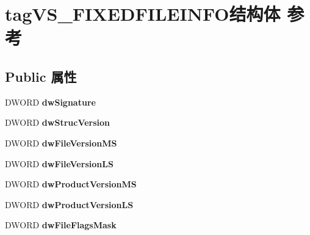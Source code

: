 \hypertarget{structtag_v_s___f_i_x_e_d_f_i_l_e_i_n_f_o}{}\section{tag\+V\+S\+\_\+\+F\+I\+X\+E\+D\+F\+I\+L\+E\+I\+N\+F\+O结构体 参考}
\label{structtag_v_s___f_i_x_e_d_f_i_l_e_i_n_f_o}
\subsection*{Public 属性}
\begin{DoxyCompactItemize}
\item 
\mbox{\label{structtag_v_s___f_i_x_e_d_f_i_l_e_i_n_f_o_a84593aae084038fcb6aa0e0f9b055dbc}} 
D\+W\+O\+RD {\bfseries dw\+Signature}
\item 
\mbox{\label{structtag_v_s___f_i_x_e_d_f_i_l_e_i_n_f_o_a707d68ab4bb1fcc55a5bfe88940ef8c8}} 
D\+W\+O\+RD {\bfseries dw\+Struc\+Version}
\item 
\mbox{\label{structtag_v_s___f_i_x_e_d_f_i_l_e_i_n_f_o_a1c8caf9934c1ecf08e636647fb367c94}} 
D\+W\+O\+RD {\bfseries dw\+File\+Version\+MS}
\item 
\mbox{\label{structtag_v_s___f_i_x_e_d_f_i_l_e_i_n_f_o_a0f235fcbe81df7f90bb743f395ea7d0f}} 
D\+W\+O\+RD {\bfseries dw\+File\+Version\+LS}
\item 
\mbox{\label{structtag_v_s___f_i_x_e_d_f_i_l_e_i_n_f_o_ac1e0386d0e10cf32db5c311d94b1e37d}} 
D\+W\+O\+RD {\bfseries dw\+Product\+Version\+MS}
\item 
\mbox{\label{structtag_v_s___f_i_x_e_d_f_i_l_e_i_n_f_o_ab24b2cf369da3337a4010be3c7bdd89a}} 
D\+W\+O\+RD {\bfseries dw\+Product\+Version\+LS}
\item 
\mbox{\label{structtag_v_s___f_i_x_e_d_f_i_l_e_i_n_f_o_aca98666e7ffb70db75d29ee2438791fe}} 
D\+W\+O\+RD {\bfseries dw\+File\+Flags\+Mask}

\end{DoxyCompactItemize}
